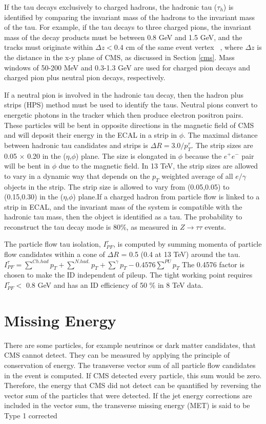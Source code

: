 \documentclass[oneside, letterpaper, oldfontcommands]{memoir}
\begin{document}
\qquad If the tau decays exclusively to charged hadrons, the hadronic tau ($\tau_{h}$) is identified by comparing the invariant mass of the hadrons to the invariant mass of the tau. For example, if the tau decays to three charged pions, the invariant mass of the decay products must be between 0.8 GeV and 1.5 GeV, and the tracks must originate within $\Delta z < 0.4$ cm of the same event vertex ~\cite{1748-0221-7-01-P01001}, where $\Delta z$ is the distance in the x-y plane of CMS, as discussed in Section \ref{cms}. Mass windows of 50-200 MeV and 0.3-1.3 GeV are used for charged pion decays and charged pion plus neutral pion decays, respectively. 

\qquad If a neutral pion is involved in the hadronic tau decay, then the hadron plus strips (HPS) method must be used to identify the taus. Neutral pions convert to energetic photons in the tracker which then produce electron positron pairs. These particles will be bent in opposite directions in the magnetic field of CMS and will deposit their energy in the ECAL in a strip in $\phi$. The maximal distance between hadronic tau candidates and strips is $\Delta R = 3.0/p_{T}^{\tau}$. The strip sizes are 0.05 $\times$ 0.20 in the ($\eta$,$\phi$) plane. The size is elongated in $\phi$ because the $e^{+}e^{-}$ pair will be bent in $\phi$ due to the magnetic field. In 13 TeV, the strip sizes are allowed to vary in a dynamic way that depends on the $p_{T}$ weighted average of all $e/ \gamma$ objects in the strip. The strip size is allowed to vary from (0.05,0.05) to (0.15,0.30) in the ($\eta$,$\phi$) plane.If a charged hadron from particle flow is linked to a strip in ECAL, and the invariant mass of the system is compatible with the hadronic tau mass, then the object is identified as a tau. The probability to reconstruct the tau decay mode is 80\%, as measured in $Z \rightarrow \tau\tau$ events.

\qquad The particle flow tau isolation, $I_{PF}^{\tau}$, is computed by summing momenta of particle flow candidates within a cone of $\Delta R$ = 0.5 (0.4 at 13 TeV) around the tau. $I_{PF}^{\tau} =  \sum\limits^{Ch. had} p_{T} + \sum\limits^{N. had.} p_{T} + \sum\limits^{\gamma} p_{T} - 0.4576 \sum\limits^{PU} p_{T}$ The 0.4576 factor is chosen to make the ID independent of pileup. The tight working point requires $I_{PF}^{\tau} <$ 0.8 GeV and has an ID efficiency of 50 \% in 8 TeV data. \cite{CMS-DP-2014-015}

\section{Missing Energy} \label{met}
\qquad There are some particles, for example neutrinos or dark matter candidates, that CMS cannot detect. They can be measured by applying the principle of conservation of energy. The transverse vector sum of all particle flow candidates in the event is computed. If CMS detected every particle, this sum would be zero. Therefore, the energy that CMS did not detect can be quantified by reversing the vector sum of the particles that were detected. If the jet energy corrections are included in the vector sum, the transverse missing energy (MET) is said to be Type 1 corrected ~\cite{Khachatryan:2014gga}
\end{document}
